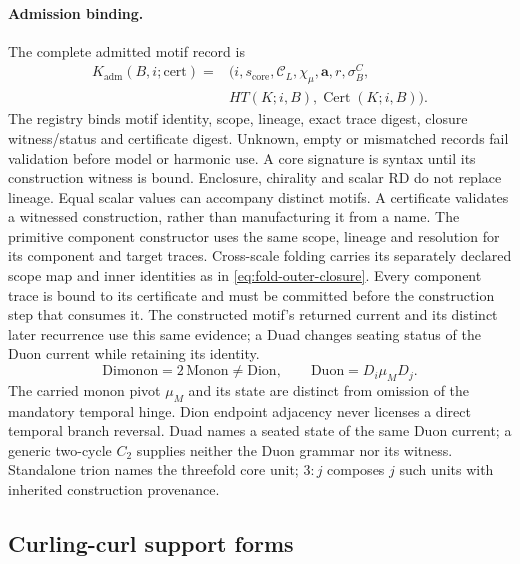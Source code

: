 \paragraph{Admission binding.}
The complete admitted motif record is
\begin{equation}
\begin{split}
K_{\mathrm{adm}}(B,i;\mathrm{cert})={}&
(i,s_{\mathrm{core}},\mathcal C_L,\chi_\mu,\mathbf a,r,\sigma^C_B,\\
&HT(K;i,B),\operatorname{Cert}(K;i,B)).
\end{split}
\label{eq:motif-admission}
\end{equation}
The registry binds motif identity, scope, lineage, exact trace digest,
closure witness/status and certificate digest. Unknown, empty or mismatched
records fail validation before model or harmonic use. A core signature is
syntax until its construction witness is bound. Enclosure, chirality and
scalar RD do not replace lineage. Equal scalar values can accompany distinct
motifs. A certificate validates a witnessed construction, rather than
manufacturing it from a name.
The primitive component constructor uses the same scope, lineage and resolution
for its component and target traces. Cross-scale folding carries its separately
declared scope map and inner identities as in \eqref{eq:fold-outer-closure}.
Every component trace is bound to its certificate and must be committed before
the construction step that consumes it. The constructed motif's returned current
and its distinct later recurrence use this same evidence; a Duad changes seating
status of the Duon current while retaining its identity.
\begin{equation}
\mathrm{Dimonon}=2\,\mathrm{Monon}\ne\mathrm{Dion},\qquad
\mathrm{Duon}=D_i\mu_M D_j.
\label{eq:motif-grammar}
\end{equation}
The carried monon pivot \(\mu_M\) and its state are distinct from omission of
the mandatory temporal hinge. Dion endpoint adjacency never licenses a direct
temporal branch reversal. Duad names a seated state of the same Duon current;
a generic two-cycle \(C_2\) supplies neither the Duon grammar nor its witness.
Standalone trion names the threefold core unit; \(3:j\) composes \(j\) such
units with inherited construction provenance.

\subsection{Curling-curl support forms}
\label{subsec:curling-curl-support-forms}


